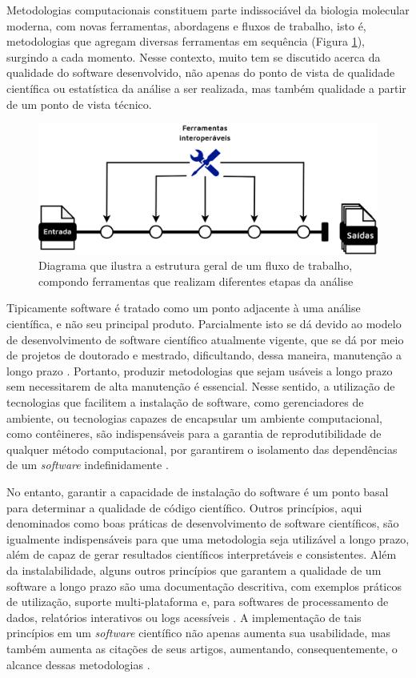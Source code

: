 \documentclass[
	12pt,				%
	oneside,			%
	a4paper,			%
	chapter=TITLE,		%
	section=TITLE,		%
	english,			%
	brazil				%
	]{abntex2}
\begin{document}
Metodologias computacionais constituem parte indissociável da biologia molecular moderna, com novas ferramentas, abordagens e fluxos de trabalho, isto é, metodologias que agregam diversas ferramentas em sequência (Figura \ref{fig:workflow}), surgindo a cada momento. Nesse contexto, muito tem se discutido acerca da qualidade do software desenvolvido, não apenas do ponto de vista de qualidade científica ou estatística da análise a ser realizada, mas também qualidade a partir de um ponto de vista técnico.
\begin{figure}[H]

{\centering \includegraphics[width=0.7\linewidth]{figure/fluxo_de_trabalho} 

}

\caption{Diagrama que ilustra a estrutura geral de um fluxo de trabalho, compondo ferramentas que realizam diferentes etapas da análise}\label{fig:workflow}
\end{figure}
Tipicamente software é tratado como um ponto adjacente à uma análise científica, e não seu principal produto. Parcialmente isto se dá devido ao modelo de desenvolvimento de software científico atualmente vigente, que se dá por meio de projetos de doutorado e mestrado, dificultando, dessa maneira, manutenção a longo prazo \autocite{altschul2013} \autocite{mangul2019a}. Portanto, produzir metodologias que sejam usáveis a longo prazo sem necessitarem de alta manutenção é essencial. Nesse sentido, a utilização de tecnologias que facilitem a instalação de software, como gerenciadores de ambiente, ou tecnologias capazes de encapsular um ambiente computacional, como contêineres, são indispensáveis para a garantia de reprodutibilidade de qualquer método computacional, por garantirem o isolamento das dependências de um \emph{software} indefinidamente \autocite{kadri2022}.

No entanto, garantir a capacidade de instalação do software é um ponto basal para determinar a qualidade de código científico. Outros princípios, aqui denominados como boas práticas de desenvolvimento de software científicos, são igualmente indispensáveis para que uma metodologia seja utilizável a longo prazo, além de capaz de gerar resultados científicos interpretáveis e consistentes. Além da instalabilidade, alguns outros princípios que garantem a qualidade de um software a longo prazo são uma documentação descritiva, com exemplos práticos de utilização, suporte multi-plataforma \autocite{mangul2019} e, para softwares de processamento de dados, relatórios interativos ou logs acessíveis \autocite{perkel2018}. A implementação de tais princípios em um \emph{software} científico não apenas aumenta sua usabilidade, mas também aumenta as citações de seus artigos, aumentando, consequentemente, o alcance dessas metodologias \autocite{mangul2019a}.
\end{document}
